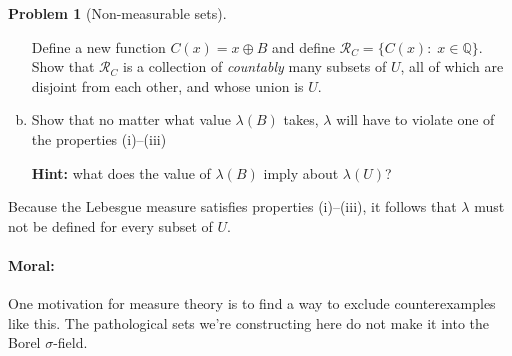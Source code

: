 \documentclass{article}
\newcommand{\cR}{\mathcal{R}}
\newcommand{\QQ}{\mathbb{Q}}
\theoremstyle{definition}
\newtheorem{problem}{Problem}
\begin{document}
\begin{problem}[Non-measurable sets]
\begin{enumerate}[(a)]
Define a new function $C(x) = x \oplus B$ and define $\cR_C = \{C(x):\; x \in \QQ\}$. Show that $\cR_C$ is a collection of {\em countably} many subsets of $U$, all of which are disjoint from each other, and whose union is $U$.




\item Show that no matter what value $\lambda(B)$ takes, $\lambda$ will have to violate one of the properties (i)--(iii)

{\bf Hint:} what does the value of $\lambda(B)$ imply about $\lambda(U)$?




\end{enumerate}

Because the Lebesgue measure satisfies properties (i)--(iii), it follows that $\lambda$ must not be defined for every subset of $U$.

\paragraph{Moral:} One motivation for measure theory is to find a way to exclude counterexamples like this. The pathological sets we're constructing here do not make it into the Borel $\sigma$-field.

\end{problem}
\end{document}
